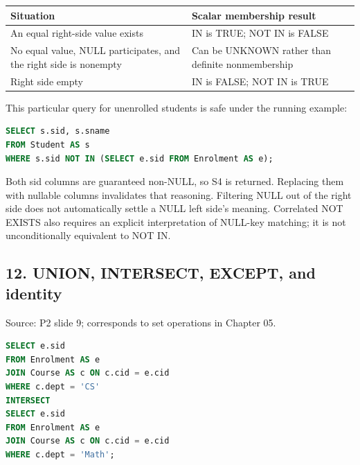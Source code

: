 \begin{longtable}[]{@{}
  >{\raggedright\arraybackslash}p{}
  >{\raggedright\arraybackslash}p{}@{}}
\toprule\noalign{}
\begin{minipage}[b]{\linewidth}\raggedright
Situation
\end{minipage} & \begin{minipage}[b]{\linewidth}\raggedright
Scalar membership result
\end{minipage} \\
\midrule\noalign{}
\endhead
\bottomrule\noalign{}
\endlastfoot
An equal right-side value exists & IN is TRUE; NOT IN is FALSE \\
No equal value, NULL participates, and the right side is nonempty & Can be UNKNOWN rather than definite nonmembership \\
Right side empty & IN is FALSE; NOT IN is TRUE \\
\end{longtable}

This particular query for unenrolled students is safe under the running example:

\Needspace{75pt}
\begin{lstlisting}[language=SQL]
SELECT s.sid, s.sname
FROM Student AS s
WHERE s.sid NOT IN (SELECT e.sid FROM Enrolment AS e);
\end{lstlisting}

Both sid columns are guaranteed non-NULL, so S4 is returned. Replacing them with nullable columns invalidates that reasoning. Filtering NULL out of the right side does not automatically settle a NULL left side's meaning. Correlated NOT EXISTS also requires an explicit interpretation of NULL-key matching; it is not unconditionally equivalent to NOT IN.

\subsection{12. UNION, INTERSECT, EXCEPT, and identity}\label{06_sql_queries_en-union-intersect-except-and-identity}

Source: P2 slide 9; corresponds to set operations in Chapter 05.

\Needspace{165pt}
\begin{lstlisting}[language=SQL]
SELECT e.sid
FROM Enrolment AS e
JOIN Course AS c ON c.cid = e.cid
WHERE c.dept = 'CS'
INTERSECT
SELECT e.sid
FROM Enrolment AS e
JOIN Course AS c ON c.cid = e.cid
WHERE c.dept = 'Math';
\end{lstlisting}

